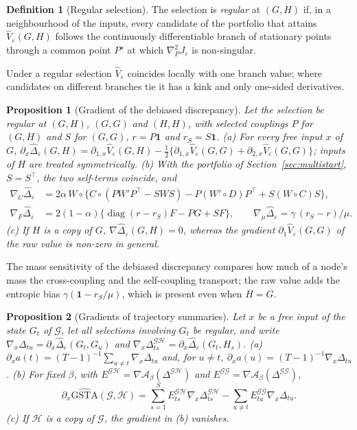 \documentclass[12pt]{article}
\newtheorem{proposition}{Proposition}
\theoremstyle{definition}
\newtheorem{definition}{Definition}
\begin{document}
\begin{definition}[Regular selection]\label{def:regular}
The selection is \emph{regular} at $(G,H)$ if, in a neighbourhood of the inputs, every candidate of the portfolio that attains $\widehat V_\varepsilon(G,H)$ follows the continuously differentiable branch of stationary points through a common point $P^\star$ at which $\nabla_P^2J_\varepsilon$ is non-singular.
\end{definition}

Under a regular selection $\widehat V_\varepsilon$ coincides locally with one branch value; where candidates on different branches tie it has a kink and only one-sided derivatives.

\begin{proposition}[Gradient of the debiased discrepancy]\label{prop:graddelta}
Let the selection be regular at $(G,H)$, $(G,G)$ and $(H,H)$, with selected couplings $P$ for $(G,H)$ and $S$ for $(G,G)$, $r=P\mathbf 1$ and $r_S=S\mathbf 1$.
(a) For every free input $x$ of $G$,
$\partial_x\widehat\Delta_\varepsilon(G,H)=\partial_{1,x}\widehat V_\varepsilon(G,H)-\tfrac12\{\partial_{1,x}\widehat V_\varepsilon(G,G)+\partial_{2,x}\widehat V_\varepsilon(G,G)\}$; inputs of $H$ are treated symmetrically.
(b) With the portfolio of Section~\ref{sec:multistart}, $S=S^\top$, the two self-terms coincide, and
\begin{align*}
\nabla_C\widehat\Delta_\varepsilon&=2\alpha\,W\circ\{C\circ(PW'P^\top-SWS)-P(W'\circ D)P^\top+S(W\circ C)S\},\\
\nabla_F\widehat\Delta_\varepsilon&=2(1-\alpha)\{\operatorname{diag}(r-r_S)F-PG+SF\},\qquad
\nabla_\mu\widehat\Delta_\varepsilon=\gamma\,(r_S-r)/\mu .
\end{align*}
(c) If $H$ is a copy of $G$, $\nabla\widehat\Delta_\varepsilon(G,H)=0$, whereas the gradient $\partial_1\widehat V_\varepsilon(G,G)$ of the raw value is non-zero in general.
\end{proposition}

The mass sensitivity of the debiased discrepancy compares how much of a node's mass the cross-coupling and the self-coupling transport; the raw value adds the entropic bias $\gamma(\mathbf 1-r_S/\mu)$, which is present even when $H=G$.

\begin{proposition}[Gradients of trajectory summaries]\label{prop:gradgsta}
Let $x$ be a free input of the state $G_t$ of $\mathcal G$, let all selections involving $G_t$ be regular, and write $\nabla_x\Delta_{tu}=\partial_x\widehat\Delta_\varepsilon(G_t,G_u)$ and $\nabla_x\Delta^{\mathcal{GH}}_{ts}=\partial_x\widehat\Delta_\varepsilon(G_t,H_s)$.
(a) $\partial_xa(t)=(T-1)^{-1}\sum_{u\neq t}\nabla_x\Delta_{tu}$ and, for $u\ne t$, $\partial_xa(u)=(T-1)^{-1}\nabla_x\Delta_{tu}$.
(b) For fixed $\beta$, with $E^{\mathcal{GH}}=\nabla\mathcal A_\beta(\Delta^{\mathcal{GH}})$ and $E^{\mathcal{GG}}=\nabla\mathcal A_\beta(\Delta^{\mathcal{GG}})$,
\[
\partial_x\widehat{\mathrm{GSTA}}(\mathcal G,\mathcal H)=\sum_{s=1}^{S}E^{\mathcal{GH}}_{ts}\nabla_x\Delta^{\mathcal{GH}}_{ts}-\sum_{u\neq t}E^{\mathcal{GG}}_{tu}\nabla_x\Delta_{tu}.
\]
(c) If $\mathcal H$ is a copy of $\mathcal G$, the gradient in (b) vanishes.
\end{proposition}
\end{document}
